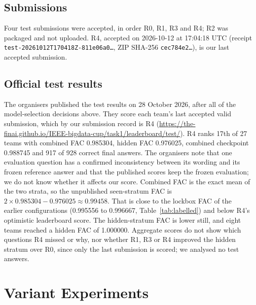 \documentclass[conference]{IEEEtran}
\newcommand{\id}[1]{\texttt{#1}}
\begin{document}
\subsection{Submissions}
Four test submissions were accepted, in order R0, R1, R3 and R4; R2 was packaged and not uploaded. R4, accepted on 2026-10-12 at 17:04:18 UTC (receipt \id{test-20261012T170418Z-811e06a0\ldots}, ZIP SHA-256 \id{cec784e2\ldots}), is our last accepted submission.

\subsection{Official test results}\label{sec:test}
The organisers published the test results on 28 October 2026, after all of the model-selection decisions above. They score each team's last accepted valid submission, which by our submission record is R4 (\url{https://the-finai.github.io/IEEE-bigdata-cup/task1/leaderboard/test/}). R4 ranks 17th of 27 teams with combined FAC 0.985304, hidden FAC 0.976025, combined checkpoint 0.988745 and 917 of 928 correct final answers. The organisers note that one evaluation question has a confirmed inconsistency between its wording and its frozen reference answer and that the published scores keep the frozen evaluation; we do not know whether it affects our score. Combined FAC is the exact mean of the two strata, so the unpublished seen-stratum FAC is $2\times0.985304-0.976025\approx0.99458$. That is close to the lockbox FAC of the earlier configurations (0.995556 to 0.996667, Table~\ref{tab:labelled}) and below R4's optimistic leaderboard score. The hidden-stratum FAC is lower still, and eight teams reached a hidden FAC of 1.000000. Aggregate scores do not show which questions R4 missed or why, nor whether R1, R3 or R4 improved the hidden stratum over R0, since only the last submission is scored; we analysed no test answers.

\section{Variant Experiments}\label{sec:negative}
\end{document}
